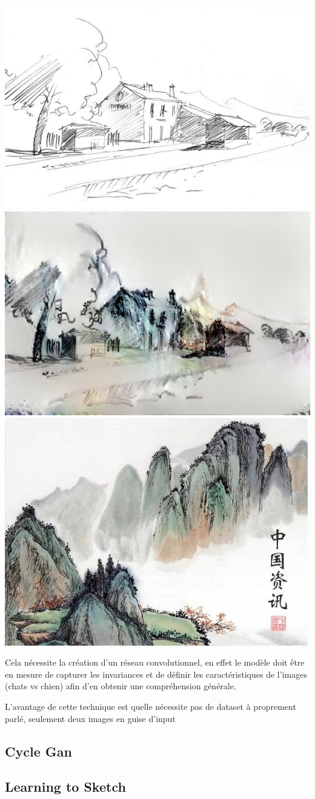 \documentclass[a4paper, 12pt]{book}
\begin{document}
\includegraphics[width=0.5\linewidth]{images/transfert-style_1.jpg}
\includegraphics[width=0.5\linewidth]{images/transfert-style_2.jpg}
\includegraphics[width=0.5\linewidth]{images/transfert-style_3.jpg}

Cela nécessite la création d'un réseau convolutionnel, en effet le modèle doit être en mesure de capturer les invariances et de définir les caractéristiques de l'images (chats vs chien) afin d'en obtenir une compréhension générale.


L'avantage de cette technique est quelle nécessite pas de dataset à proprement parlé, seulement deux images en guise d'input



\subsection{Cycle Gan}

\subsection{Learning to Sketch}
\end{document}
